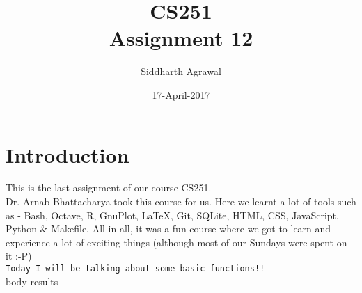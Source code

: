 \documentclass[a4paper,10pt]{article}
\title{CS251\\Assignment 12}
\author{Siddharth Agrawal}
\date{17-April-2017}
\begin{document}
\maketitle
\section*{Introduction}
This is the last assignment of our course CS251.\\
Dr. Arnab Bhattacharya\cite{arnab} took this course for us. Here we learnt a lot of tools such as - Bash, Octave, R, GnuPlot, \LaTeX, Git, SQLite, HTML, CSS, JavaScript, Python \& Makefile. All in all, it was a fun course where we got to learn and experience a lot of exciting things (although most of our Sundays were spent on it :-P)\\
\texttt{Today I will be talking about some basic functions!!}\\

{body}
{results}

\FloatBarrier



\end{document}
